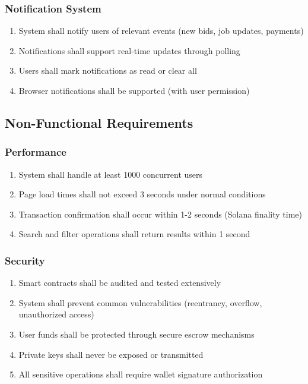 \documentclass[a4paper,13pt,twoside]{report}
\theoremstyle{definition}
\begin{document}
\subsubsection{Notification System}

\begin{enumerate}
    \item System shall notify users of relevant events (new bids, job updates, payments)
    \item Notifications shall support real-time updates through polling
    \item Users shall mark notifications as read or clear all
    \item Browser notifications shall be supported (with user permission)
\end{enumerate}

\subsection{Non-Functional Requirements}

\subsubsection{Performance}

\begin{enumerate}
    \item System shall handle at least 1000 concurrent users
    \item Page load times shall not exceed 3 seconds under normal conditions
    \item Transaction confirmation shall occur within 1-2 seconds (Solana finality time)
    \item Search and filter operations shall return results within 1 second
\end{enumerate}

\subsubsection{Security}

\begin{enumerate}
    \item Smart contracts shall be audited and tested extensively
    \item System shall prevent common vulnerabilities (reentrancy, overflow, unauthorized access)
    \item User funds shall be protected through secure escrow mechanisms
    \item Private keys shall never be exposed or transmitted
    \item All sensitive operations shall require wallet signature authorization
\end{enumerate}
\end{document}
